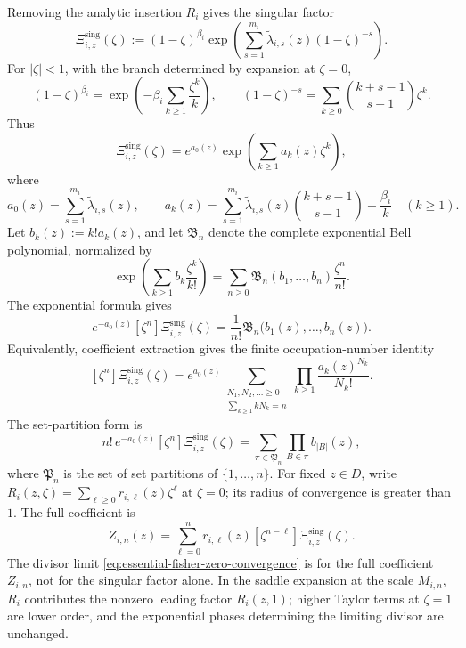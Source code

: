 \documentclass[reqno]{article}
\theoremstyle{definition}
\theoremstyle{remark}
\theoremstyle{plain}
\begin{document}
Removing the analytic insertion $R_i$ gives the singular factor
\begin{equation}\label{eq:essential-singular-factor}
\Xi^{\mathrm{sing}}_{i,z}(\zeta):=(1-\zeta)^{\beta_i}
\exp\!\left(\sum_{s=1}^{m_i}\widetilde\lambda_{i,s}(z)(1-\zeta)^{-s}\right).
\end{equation}
For $|\zeta|<1$, with the branch determined by expansion at $\zeta=0$,
\[
(1-\zeta)^{\beta_i}=\exp\!\left(-\beta_i\sum_{k\ge1}\frac{\zeta^k}{k}\right),
\qquad
(1-\zeta)^{-s}=\sum_{k\ge0}\binom{k+s-1}{s-1}\zeta^k.
\]
Thus
\begin{equation}\label{eq:essential-cluster-activities}
\Xi^{\mathrm{sing}}_{i,z}(\zeta)
=e^{a_0(z)}\exp\!\left(\sum_{k\ge1}a_k(z)\zeta^k\right),
\end{equation}
where
\[
a_0(z)=\sum_{s=1}^{m_i}\widetilde\lambda_{i,s}(z),
\qquad
a_k(z)=\sum_{s=1}^{m_i}\widetilde\lambda_{i,s}(z)\binom{k+s-1}{s-1}-\frac{\beta_i}{k}\quad(k\ge1).
\]
Let $b_k(z):=k!a_k(z)$, and let $\mathfrak B_n$ denote the complete exponential Bell polynomial, normalized by
\[
\exp\!\left(\sum_{k\ge1}b_k\frac{\zeta^k}{k!}\right)
=\sum_{n\ge0}\mathfrak B_n(b_1,\ldots,b_n)\frac{\zeta^n}{n!}.
\]
The exponential formula gives
\[
e^{-a_0(z)}[\zeta^n]\Xi^{\mathrm{sing}}_{i,z}(\zeta)
=\frac{1}{n!}\mathfrak B_n\bigl(b_1(z),\ldots,b_n(z)\bigr).
\]
Equivalently, coefficient extraction gives the finite occupation-number identity
\begin{equation}\label{eq:essential-occupation}
[\zeta^n]\Xi^{\mathrm{sing}}_{i,z}(\zeta)
=e^{a_0(z)}
\sum_{\substack{N_1,N_2,\ldots\ge0\\ \sum_{k\ge1}kN_k=n}}
\prod_{k\ge1}\frac{a_k(z)^{N_k}}{N_k!}.
\end{equation}
The set-partition form is
\begin{equation}\label{eq:essential-labelled-polymer}
n!\,e^{-a_0(z)}[\zeta^n]\Xi^{\mathrm{sing}}_{i,z}(\zeta)
=\sum_{\pi\in\mathfrak P_n}\prod_{B\in\pi}b_{|B|}(z),
\end{equation}
where $\mathfrak P_n$ is the set of set partitions of $\{1,\ldots,n\}$.
For fixed $z\in D$, write $R_i(z,\zeta)=\sum_{\ell\ge0}r_{i,\ell}(z)\zeta^\ell$ at $\zeta=0$; its radius of convergence is greater than $1$. The full coefficient is
\begin{equation}\label{eq:essential-full-insertion}
Z_{i,n}(z)=\sum_{\ell=0}^n r_{i,\ell}(z)
[\zeta^{n-\ell}]\Xi^{\mathrm{sing}}_{i,z}(\zeta).
\end{equation}
The divisor limit \eqref{eq:essential-fisher-zero-convergence} is for the full coefficient $Z_{i,n}$, not for the singular factor alone. In the saddle expansion at the scale \(M_{i,n}\), \(R_i\) contributes the nonzero leading factor \(R_i(z,1)\); higher Taylor terms at \(\zeta=1\) are lower order, and the exponential phases determining the limiting divisor are unchanged.
\end{document}
